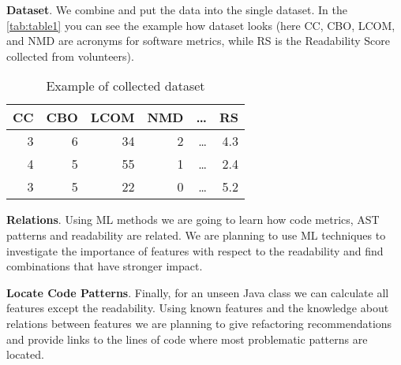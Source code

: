 \textbf{Dataset}.
We combine and put the data into the single dataset. 
In the \autoref{tab:table1} you can see the example how dataset looks
(here CC, CBO, LCOM, and NMD are acronyms for software metrics, 
while RS is the Readability Score collected from volunteers).

\begin{table}[H]
\begin{center}
\begin{tabular}{rrrrrr}
\hline
CC & CBO & LCOM & NMD & \dots & RS \\
\hline
3 & 6 & 34 & 2 & \dots & 4.3 \\
4 & 5 & 55 & 1 & \dots & 2.4 \\
3 & 5 & 22 & 0 & \dots & 5.2 \\ 
\hline
\end{tabular}
\end{center}
\caption{Example of collected dataset}
\label{tab:table1}
\end{table}

\textbf{Relations}.
Using ML methods we are going to learn how code metrics, 
AST patterns and readability are related. 
We are planning to use ML techniques to investigate the importance of features 
with respect to the readability and find combinations that have stronger impact.

\textbf{Locate Code Patterns}.
Finally, for an unseen Java class we can calculate all features except the readability. 
Using known features and the knowledge about relations between features we are planning
to give refactoring recommendations and provide links to the lines of code 
where most problematic patterns are located.   

